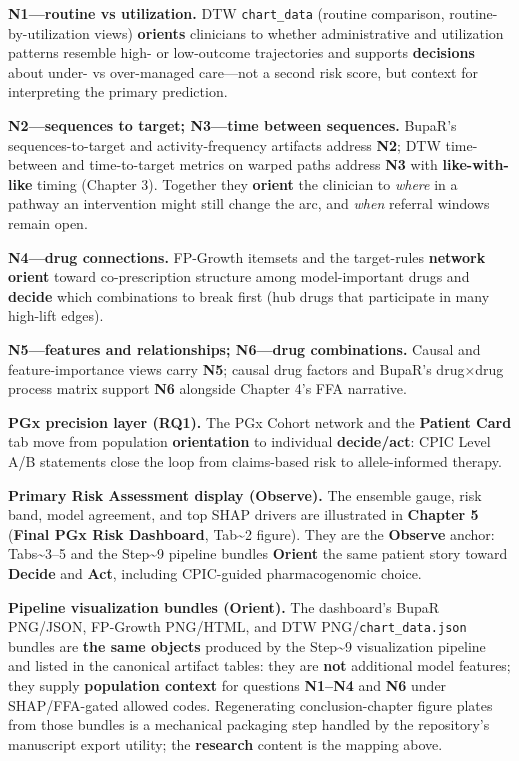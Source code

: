 \documentclass[
  12pt,
]{book}
\begin{document}
\textbf{N1---routine vs utilization.} DTW \texttt{chart\_data} (routine
comparison, routine-by-utilization views) \textbf{orients} clinicians to
whether administrative and utilization patterns resemble high- or
low-outcome trajectories and supports \textbf{decisions} about under- vs
over-managed care---not a second risk score, but context for
interpreting the primary prediction.

\textbf{N2---sequences to target; N3---time between sequences.} BupaR's
sequences-to-target and activity-frequency artifacts address
\textbf{N2}; DTW time-between and time-to-target metrics on warped paths
address \textbf{N3} with \textbf{like-with-like} timing (Chapter 3).
Together they \textbf{orient} the clinician to \emph{where} in a pathway
an intervention might still change the arc, and \emph{when} referral
windows remain open.

\textbf{N4---drug connections.} FP-Growth itemsets and the target-rules
\textbf{network} \textbf{orient} toward co-prescription structure among
model-important drugs and \textbf{decide} which combinations to break
first (hub drugs that participate in many high-lift edges).

\textbf{N5---features and relationships; N6---drug combinations.} Causal
and feature-importance views carry \textbf{N5}; causal drug factors and
BupaR's drug×drug process matrix support \textbf{N6} alongside Chapter
4's FFA narrative.

\textbf{PGx precision layer (RQ1).} The PGx Cohort network and the
\textbf{Patient Card} tab move from population \textbf{orientation} to
individual \textbf{decide/act}: CPIC Level A/B statements close the loop
from claims-based risk to allele-informed therapy.

\textbf{Primary Risk Assessment display (Observe).} The ensemble gauge,
risk band, model agreement, and top SHAP drivers are illustrated in
\textbf{Chapter 5} (\textbf{Final PGx Risk Dashboard},
Tab\textasciitilde2 figure). They are the \textbf{Observe} anchor:
Tabs\textasciitilde3--5 and the Step\textasciitilde9 pipeline bundles
\textbf{Orient} the same patient story toward \textbf{Decide} and
\textbf{Act}, including CPIC-guided pharmacogenomic choice.

\textbf{Pipeline visualization bundles (Orient).} The dashboard's BupaR
PNG/JSON, FP-Growth PNG/HTML, and DTW PNG/\texttt{chart\_data.json}
bundles are \textbf{the same objects} produced by the
Step\textasciitilde9 visualization pipeline and listed in the canonical
artifact tables: they are \textbf{not} additional model features; they
supply \textbf{population context} for questions \textbf{N1--N4} and
\textbf{N6} under SHAP/FFA-gated allowed codes. Regenerating
conclusion-chapter figure plates from those bundles is a mechanical
packaging step handled by the repository's manuscript export utility;
the \textbf{research} content is the mapping above.
\end{document}
